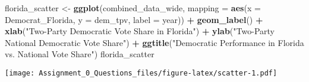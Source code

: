 \documentclass[
]{article}
\newenvironment{Shaded}{\begin{snugshade}}{\end{snugshade}}
\newcommand{\AttributeTok}[1]{\textcolor[rgb]{0.13,0.29,0.53}{#1}}
\newcommand{\FunctionTok}[1]{\textcolor[rgb]{0.13,0.29,0.53}{\textbf{#1}}}
\newcommand{\NormalTok}[1]{#1}
\newcommand{\OtherTok}[1]{\textcolor[rgb]{0.56,0.35,0.01}{#1}}
\newcommand{\SpecialCharTok}[1]{\textcolor[rgb]{0.81,0.36,0.00}{\textbf{#1}}}
\newcommand{\StringTok}[1]{\textcolor[rgb]{0.31,0.60,0.02}{#1}}
\begin{document}
\begin{Shaded}
\begin{Highlighting}[]
\NormalTok{florida\_scatter }\OtherTok{\textless{}{-}} \FunctionTok{ggplot}\NormalTok{(combined\_data\_wide, }
                          \AttributeTok{mapping =} \FunctionTok{aes}\NormalTok{(}\AttributeTok{x =}\NormalTok{ Democrat\_Florida, }\AttributeTok{y =}\NormalTok{ dem\_tpv,}
                                        \AttributeTok{label =}\NormalTok{ year)) }\SpecialCharTok{+}
  \FunctionTok{geom\_label}\NormalTok{() }\SpecialCharTok{+}
  \FunctionTok{xlab}\NormalTok{(}\StringTok{"Two{-}Party Democratic Vote Share in Florida"}\NormalTok{) }\SpecialCharTok{+}
  \FunctionTok{ylab}\NormalTok{(}\StringTok{"Two{-}Party National Democratic Vote Share"}\NormalTok{) }\SpecialCharTok{+}
  \FunctionTok{ggtitle}\NormalTok{(}\StringTok{"Democratic Performance in Florida vs. National Vote Share"}\NormalTok{)}
\NormalTok{florida\_scatter}
\end{Highlighting}
\end{Shaded}

\texttt{[image: Assignment\_0\_Questions\_files/figure-latex/scatter-1.pdf]}
\end{document}
